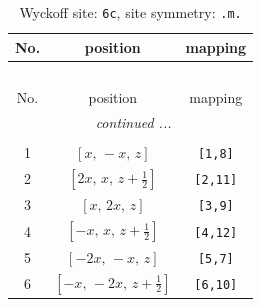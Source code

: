 \documentclass[fleqn,8pt]{jsarticle}
\begin{document}
\renewcommand{\arraystretch}{1.2}
\begin{longtable}{ccc}
\caption{Wyckoff site: {\tt 6c}, site symmetry: {\tt .m.}}
 \\
 \hline \hline
No. & position & mapping \\ \hline \endfirsthead

\multicolumn{2}{l}{\tablename\ \thetable{}} \\
 \hline \hline
No. & position & mapping \\ \hline \endhead

 \hline \hline
\multicolumn{2}{r}{\footnotesize\it continued ...} \\ \endfoot

 \hline \hline
\multicolumn{2}{r}{} \\ \endlastfoot

1 & $\left[ x,\, - x,\, z \right]$ & {\tt [1,8]} \\ \hline
2 & $\left[ 2 x,\, x,\, z + \frac{1}{2} \right]$ & {\tt [2,11]} \\ \hline
3 & $\left[ x,\, 2 x,\, z \right]$ & {\tt [3,9]} \\ \hline
4 & $\left[ - x,\, x,\, z + \frac{1}{2} \right]$ & {\tt [4,12]} \\ \hline
5 & $\left[ - 2 x,\, - x,\, z \right]$ & {\tt [5,7]} \\ \hline
6 & $\left[ - x,\, - 2 x,\, z + \frac{1}{2} \right]$ & {\tt [6,10]} \\
\end{longtable}
\renewcommand{\arraystretch}{1.2}
\end{document}
